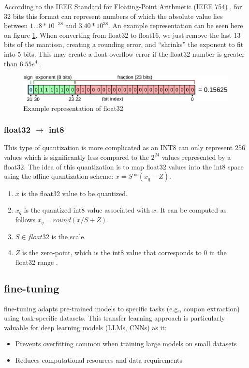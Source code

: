 \documentclass[licencjacka,en]{pracamgr}
\begin{document}
According to the IEEE Standard for Floating-Point Arithmetic (IEEE 754) \cite{IEEE754}, for 32 bits this format can represent numbers of which the absolute value lies between $1.18 * 10^{-38}$ and $3.40 * 10^{38}$. An example representation can be seen here on figure \ref{fig:float}.
When converting from float32 to float16, we just remove the last 13 bits of the mantissa, creating a rounding error, and “shrinks” the exponent to fit into 5 bits. This may create a float overflow error if the float32 number is greater than $ 6.55e^4$ \cite{quant_explained}.

\begin{figure}
    \centering
    \includegraphics[width=1.0\linewidth]{bachelor_images/mantis.png}
    \caption{Example representation of float32 \cite{IEEE754}}
    \label{fig:float}
\end{figure}

\subsubsection{float32 $\rightarrow$ int8}
This type of quantization is more complicated as an INT8 can only represent 256 values which is significantly less compared to the $ 2^{24} $  values represented by a float32. The idea of this quantization is to map float32 values into the int8 space using the affine quantization scheme: $ x = S * (x_q - Z) $.
\begin{enumerate}
	\item $ x $ is the float32 value to be quantized.
	\item  $ x_q $ is the quantized int8 value associated with $ x $. It can be computed as follows $ x_q = round(x/S + Z) $.
	\item $ S \in float32$ is the scale.
	\item $ Z $ is the zero-point, which is the int8 value that corresponds to 0 in the float32 range \cite{quant_hf}.
\end{enumerate}

\subsection{fine-tuning}
fine-tuning adapts pre-trained models to specific tasks (e.g., coupon extraction) using task-specific datasets. This transfer learning approach is particularly valuable for deep learning models (LLMs, CNNs) as it:
\begin{itemize}
    \item Prevents overfitting common when training large models on small datasets
    \item Reduces computational resources and data requirements \cite{ibm_fine-tuning}
\end{itemize}
\end{document}
